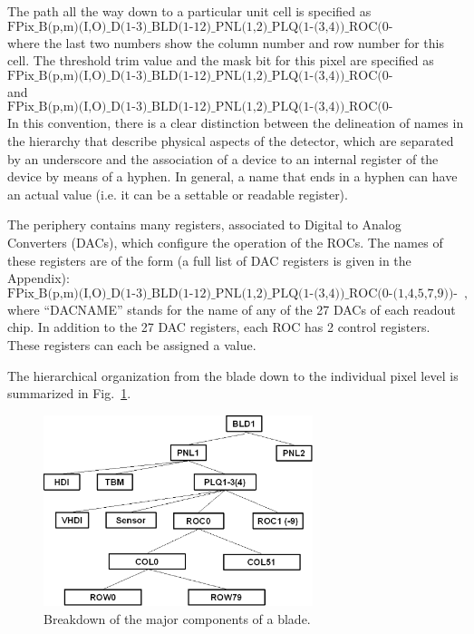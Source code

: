 \documentclass{cmspaper}
\begin{document}
The path all the way  down to a particular  unit cell is specified as 
$$\mbox{FPix\_B(p,m)(I,O)\_D(1-3)\_BLD(1-12)\_PNL(1,2)\_PLQ(1-(3,4))\_
ROC(0-(1,4,5,7,9))\_COL(0-51)\_ROW(0-79)}$$ 
where the last two numbers
show the column number and row number for this cell. The threshold trim value
and the mask bit for this pixel are specified as
$$\mbox{FPix\_B(p,m)(I,O)\_D(1-3)\_BLD(1-12)\_PNL(1,2)\_PLQ(1-(3,4))\_
ROC(0-(1,4,5,7,9))\_COL(0-51)\_ROW(0-79)-TRIM}$$ and
$$\mbox{FPix\_B(p,m)(I,O)\_D(1-3)\_BLD(1-12)\_PNL(1,2)\_PLQ(1-(3,4))\_
ROC(0-(1,4,5,7,9))\_COL(0-51)\_ROW(0-79)-MASK}$$ 
In this convention, there is a clear distinction between the delineation
of names in the hierarchy that describe physical aspects of the detector,
which are separated by an underscore and the association of a device to an internal
register of the device by means of a hyphen. In general, a name that ends in
a hyphen can have an actual value (i.e. it can be a settable or readable register).

The periphery contains many registers, 
associated to Digital to Analog Converters (DACs), 
which configure the operation of the ROCs. 
The names of these registers are of the form (a full list of DAC registers is given in the Appendix):
\begin{displaymath}
\mbox{FPix\_B(p,m)(I,O)\_D(1-3)\_BLD(1-12)\_PNL(1,2)\_PLQ(1-(3,4))\_ROC(0-(1,4,5,7,9))-DACNAME},
\end{displaymath}
where ``DACNAME'' stands for the name of any of the 27 DACs of each readout chip. 
In addition to the 27 DAC registers, each ROC has 2 control registers.
These registers can each be assigned a value.
 
The hierarchical organization from the blade down to the individual pixel level
is summarized in Fig.~\ref{figure:bld}.

\begin{figure}[hbtp]  
  \begin{center}  
        \includegraphics[width =0.7\textwidth]{Bld.eps}  
    \caption{Breakdown of the major components of a blade.}  
    \label{figure:bld}  
  \end{center}  
\end{figure}  
\end{document}
